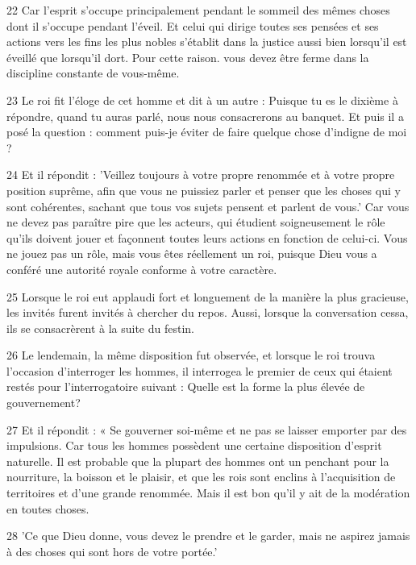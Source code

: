 \par 22 Car l'esprit s'occupe principalement pendant le sommeil des mêmes choses dont il s'occupe pendant l'éveil. Et celui qui dirige toutes ses pensées et ses actions vers les fins les plus nobles s’établit dans la justice aussi bien lorsqu’il est éveillé que lorsqu’il dort. Pour cette raison. vous devez être ferme dans la discipline constante de vous-même.

\par 23 Le roi fit l'éloge de cet homme et dit à un autre : Puisque tu es le dixième à répondre, quand tu auras parlé, nous nous consacrerons au banquet. Et puis il a posé la question : comment puis-je éviter de faire quelque chose d’indigne de moi ?

\par 24 Et il répondit : 'Veillez toujours à votre propre renommée et à votre propre position suprême, afin que vous ne puissiez parler et penser que les choses qui y sont cohérentes, sachant que tous vos sujets pensent et parlent de vous.' Car vous ne devez pas paraître pire que les acteurs, qui étudient soigneusement le rôle qu'ils doivent jouer et façonnent toutes leurs actions en fonction de celui-ci. Vous ne jouez pas un rôle, mais vous êtes réellement un roi, puisque Dieu vous a conféré une autorité royale conforme à votre caractère.

\par 25 Lorsque le roi eut applaudi fort et longuement de la manière la plus gracieuse, les invités furent invités à chercher du repos. Aussi, lorsque la conversation cessa, ils se consacrèrent à la suite du festin.

\par 26 Le lendemain, la même disposition fut observée, et lorsque le roi trouva l'occasion d'interroger les hommes, il interrogea le premier de ceux qui étaient restés pour l'interrogatoire suivant : Quelle est la forme la plus élevée de gouvernement?

\par 27 Et il répondit : « Se gouverner soi-même et ne pas se laisser emporter par des impulsions. Car tous les hommes possèdent une certaine disposition d’esprit naturelle. Il est probable que la plupart des hommes ont un penchant pour la nourriture, la boisson et le plaisir, et que les rois sont enclins à l'acquisition de territoires et d'une grande renommée. Mais il est bon qu'il y ait de la modération en toutes choses.

\par 28 'Ce que Dieu donne, vous devez le prendre et le garder, mais ne aspirez jamais à des choses qui sont hors de votre portée.'


